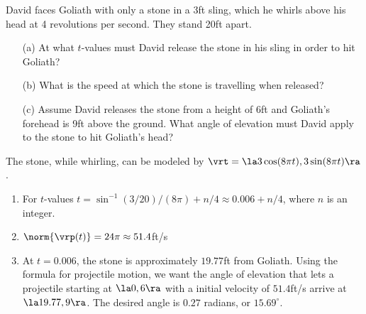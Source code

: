 {David faces Goliath with only a stone in a 3ft sling,  which he whirls above his head at 4 revolutions per second. They stand 20ft apart.
\begin{enumerate}
	\item [(a)]	At what $t$-values must David release the stone in his sling in order to hit Goliath?
	\item	[(b)] What is the speed at which the stone is travelling when released?
	\item	[(c)] Assume David releases the stone from a height of 6ft and Goliath's forehead is 9ft above the ground. What angle of elevation must David apply to the stone to hit Goliath's head?
\end{enumerate}
}
{The stone, while whirling, can be modeled by $\vrt = \la 3\cos(8\pi t),3\sin (8\pi t)\ra$. 
\begin{enumerate}
	\item For $t$-values $t=\sin^{-1}(3/20)/(8\pi) + n/4 \approx 0.006 + n/4$, where $n$ is an integer.
	\item		$\norm{\vrp(t)} = 24\pi\approx 51.4$ft/s
	\item		At $t=0.006$, the stone is approximately $19.77$ft from Goliath. Using the formula for projectile motion, we want the angle of elevation that lets a projectile starting at $\la 0,6\ra$ with a initial velocity of $51.4$ft/s arrive at $\la 19.77,9\ra$. The desired angle is $0.27$ radians, or $15.69^\circ$.
\end{enumerate}
}